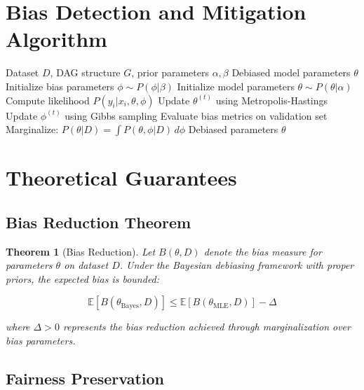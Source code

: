 \documentclass[11pt,a4paper]{article}
\theoremstyle{plain}
\newtheorem{theorem}{Theorem}[section]
\theoremstyle{definition}
\theoremstyle{remark}
\begin{document}
\section{Bias Detection and Mitigation Algorithm}

\begin{algorithm}
\caption{Bayesian Bias Mitigation}
\begin{algorithmic}[1]
\REQUIRE Dataset $D$, DAG structure $G$, prior parameters $\alpha, \beta$
\ENSURE Debiased model parameters $\theta$
\STATE Initialize bias parameters $\phi \sim P(\phi|\beta)$
\STATE Initialize model parameters $\theta \sim P(\theta|\alpha)$
        \STATE Compute likelihood $P(y_i|x_i, \theta, \phi)$
        \STATE Update $\theta^{(t)}$ using Metropolis-Hastings
        \STATE Update $\phi^{(t)}$ using Gibbs sampling
    \ENDFOR
    \STATE Evaluate bias metrics on validation set
\ENDFOR
\STATE Marginalize: $P(\theta|D) = \int P(\theta, \phi|D) \, d\phi$
\RETURN Debiased parameters $\theta$
\end{algorithmic}
\end{algorithm}

\section{Theoretical Guarantees}

\subsection{Bias Reduction Theorem}

\begin{theorem}[Bias Reduction]
Let $B(\theta, D)$ denote the bias measure for parameters $\theta$ on dataset $D$. Under the Bayesian debiasing framework with proper priors, the expected bias is bounded:

\begin{equation}
\mathbb{E}[B(\theta_{\text{Bayes}}, D)] \leq \mathbb{E}[B(\theta_{\text{MLE}}, D)] - \Delta
\end{equation}

where $\Delta > 0$ represents the bias reduction achieved through marginalization over bias parameters.
\end{theorem}

\subsection{Fairness Preservation}
\end{document}
